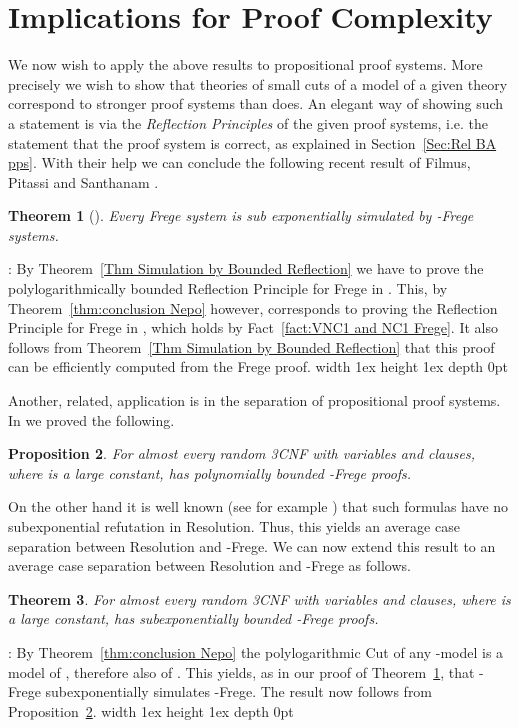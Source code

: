 \documentclass{LMCS}
\newtheorem{theorem}{Theorem}[section]
\newtheorem{proposition}[theorem]{Proposition}
\newenvironment{proof}{\QuadSpace\par\noindent{\bf
Proof}:}{\EndProof\HalfSpace} \fi
\newcommand{\QuadSpace}{}\newcommand{\HalfSpace}{}\newcommand{\FullSpace}{}\newcommand{\EndProof}{ \hfill \vrule width 1ex height 1ex depth 0pt }
\newenvironment{proof}{

\smallskip
\noindent\emph{Proof.}}{\hfill
\bigskip
} \fi
\begin{document}
\section{Implications for Proof Complexity}\label{Sec:Impl Proof Cmpl}

We now wish to apply the above results to propositional proof systems. More precisely we wish to show that
theories of small cuts of a model of a given theory  correspond to stronger proof systems than
 does. An elegant way of showing such a statement is via the {\em Reflection Principles} of the
given proof systems, i.e. the statement that the proof system is correct, as explained in Section~\ref{Sec:Rel
BA pps}. With their help we can conclude the following recent result of Filmus, Pitassi and Santhanam
\cite{FPS11}.

\begin{theorem}[\cite{FPS11}]\label{thm FilPitSat}
  Every Frege system is sub exponentially simulated
  by -Frege systems.
\end{theorem}

\begin{proof}
  By Theorem~\ref{Thm Simulation by Bounded Reflection} we have to prove the polylogarithmically bounded Reflection
  Principle for Frege in . This, by Theorem~\ref{thm:conclusion Nepo} however,
  corresponds to proving the Reflection Principle for Frege in , which holds by
  Fact~\ref{fact:VNC1 and NC1 Frege}. It also follows from Theorem~\ref{Thm Simulation by Bounded Reflection} that this proof can be efficiently computed from the Frege proof.
\end{proof}

Another, related, application is in the separation of propositional proof systems. In \cite{MT11} we proved the
following.
\begin{proposition}\label{Prop Iddo me}
  For almost every random 3CNF  with  variables and  clauses, where  is a large
  constant,  has polynomially bounded -Frege proofs.
\end{proposition}
On the other hand it is well known (see for example \cite{CS88}) that such formulas have no subexponential
refutation in Resolution. Thus, this yields an average case separation between Resolution and
-Frege. We can now extend this result to an average case separation between Resolution and
-Frege as follows.
\begin{theorem}
  For almost every random 3CNF  with  variables and  clauses, where  is a large
  constant,  has subexponentially bounded -Frege proofs.
\end{theorem}
\begin{proof}
  By Theorem~\ref{thm:conclusion Nepo} the polylogarithmic Cut of any -model is a model of ,
  therefore also of . This yields, as in our proof of Theorem~\ref{thm FilPitSat}, that
  -Frege subexponentially simulates -Frege. The result now follows from
  Proposition~\ref{Prop Iddo me}.
\end{proof}
\end{document}
